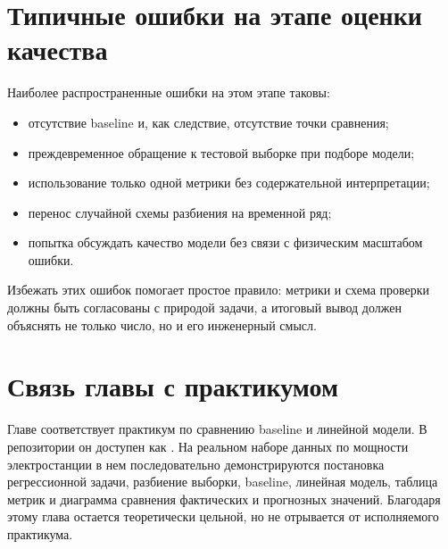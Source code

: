 \section{Типичные ошибки на этапе оценки качества}

Наиболее распространенные ошибки на этом этапе таковы:
\begin{itemize}[leftmargin=1.25cm]
\item отсутствие baseline и, как следствие, отсутствие точки сравнения;
\item преждевременное обращение к тестовой выборке при подборе модели;
\item использование только одной метрики без содержательной интерпретации;
\item перенос случайной схемы разбиения на временной ряд;
\item попытка обсуждать качество модели без связи с физическим масштабом ошибки.
\end{itemize}

Избежать этих ошибок помогает простое правило: метрики и схема проверки должны быть согласованы с природой задачи, а итоговый вывод должен объяснять не только число, но и его инженерный смысл.

\section{Связь главы с практикумом}

Главе соответствует практикум по сравнению baseline и линейной модели. В репозитории он доступен как . На реальном наборе данных по мощности электростанции в нем последовательно демонстрируются постановка регрессионной задачи, разбиение выборки, baseline, линейная модель, таблица метрик и диаграмма сравнения фактических и прогнозных значений. Благодаря этому глава остается теоретически цельной, но не отрывается от исполняемого практикума.
